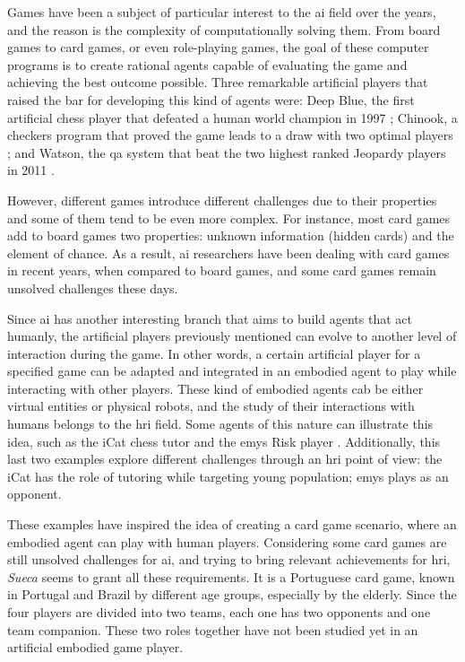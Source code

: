 \label{sec:introduction}

Games have been a subject of particular interest to the \ac{ai} field over the years, and the reason is the complexity of computationally solving them.
From board games to card games, or even role-playing games, the goal of these computer programs is to create rational agents capable of evaluating the game and achieving the best outcome possible.
Three remarkable artificial players that raised the bar for developing this kind of agents were: Deep Blue, the first artificial chess player that defeated a human world champion in 1997 \cite{Campbell2002}; Chinook, a checkers program that proved the game leads to a draw with two optimal players \cite{Schaeffer1996}; and Watson, the \ac{qa} system that beat the two highest ranked Jeopardy players in 2011 \cite{Ferrucci2010}.

However, different games introduce different challenges due to their properties and some of them tend to be even more complex.
For instance, most card games add to board games two properties: unknown information (hidden cards) and the element of chance.
As a result, \ac{ai} researchers have been dealing with card games in recent years, when compared to board games, and some card games remain unsolved challenges these days.

Since \ac{ai} has another interesting branch that aims to build agents that act humanly, the artificial players previously mentioned can evolve to another level of interaction during the game.
In other words, a certain artificial player for a specified game can be adapted and integrated in an embodied agent to play while interacting with other players.
These kind of embodied agents cab be either virtual entities or physical robots, and the study of their interactions with humans belongs to the \ac{hri} field.
Some agents of this nature can illustrate this idea, such as the iCat chess tutor \cite{Affective2007} and the \ac{emys} Risk player \cite{Pereira}.
Additionally, this last two examples explore different challenges through an \ac{hri} point of view: the iCat has the role of tutoring while targeting young population; \ac{emys} plays as an opponent.

These examples have inspired the idea of creating a card game scenario, where an embodied agent can play with human players.
Considering some card games are still unsolved challenges for \ac{ai}, and trying to bring relevant achievements for \ac{hri}, \emph{Sueca} seems to grant all these requirements.
It is a Portuguese card game, known in Portugal and Brazil by different age groups, especially by the elderly.
Since the four players are divided into two teams, each one has two opponents and one team companion.
These two roles together have not been studied yet in an artificial embodied game player.

